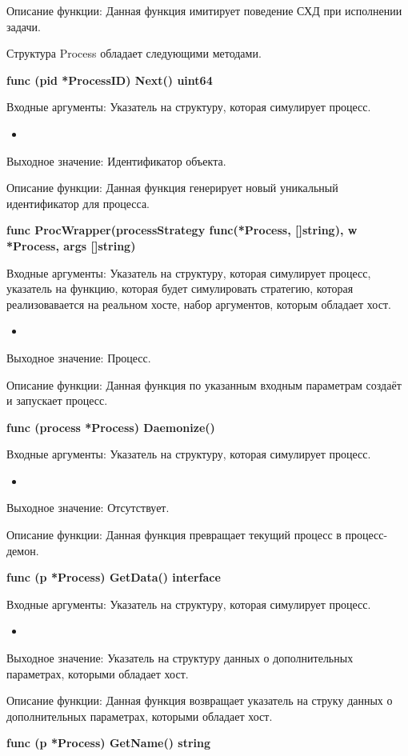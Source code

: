 Описание функции: Данная функция имитирует поведение СХД при исполнении задачи.


Структура Process обладает следующими методами.

\textbf{func (pid *ProcessID) Next() uint64}

Входные аргументы: Указатель на структуру, которая симулирует процесс.
\begin{itemize}
	\item 
\end{itemize}
Выходное значение: Идентификатор объекта.

Описание функции: Данная функция генерирует новый уникальный идентификатор для процесса.

\textbf{func ProcWrapper(processStrategy func(*Process, []string), w *Process, args []string)}

Входные аргументы: Указатель на структуру, которая симулирует процесс, указатель на функцию, которая будет симулировать стратегию, которая реализовавается на реальном хосте, набор аргументов, которым обладает хост.
\begin{itemize}
	\item 
\end{itemize}
Выходное значение: Процесс.

Описание функции: Данная функция по указанным входным параметрам создаёт и запускает процесс.


\textbf{func (process *Process) Daemonize() }

Входные аргументы: Указатель на структуру, которая симулирует процесс.
\begin{itemize}
	\item 
\end{itemize}
Выходное значение: Отсутствует.

Описание функции: Данная функция превращает текущий процесс в процесс-демон.


\textbf{func (p *Process) GetData() interface}

Входные аргументы: Указатель на структуру, которая симулирует процесс.
\begin{itemize}
	\item 
\end{itemize}
Выходное значение: Указатель на структуру данных о дополнительных параметрах, которыми обладает хост.

Описание функции: Данная функция возвращает указатель на струку данных о дополнительных параметрах, которыми обладает хост.


\textbf{func (p *Process) GetName() string}

